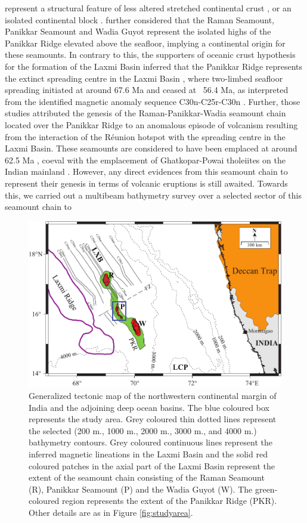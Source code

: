 \documentclass[twocolumn]{article}
\begin{document}
\begin{figure}[!htb]
\end{figure} represent a structural feature of less altered stretched continental crust \citep{Krishna2006}, or an isolated continental block \citep{Geoffroy2020}. \cite{Krishna2006} further considered that the Raman Seamount, Panikkar Seamount and Wadia Guyot represent the isolated highs of the Panikkar Ridge elevated above the seafloor, implying a continental origin for these seamounts. In contrary to this, the supporters of oceanic crust hypothesis for the formation of the Laxmi Basin inferred that the Panikkar Ridge represents the extinct spreading centre in the Laxmi Basin \citep{Bhattacharya1994a,Bhattacharya1994b}, where two-limbed seafloor spreading initiated at around 67.6 Ma and ceased at ~56.4 Ma, as interpreted from the identified magnetic anomaly sequence C30n-C25r-C30n \citep{Bhattacharya2015,Yatheesh2020}. Further, those studies attributed the genesis of the Raman-Panikkar-Wadia seamount chain located over the Panikkar Ridge to an anomalous episode of volcanism resulting from the interaction of the R\'eunion hotspot with the spreading centre in the Laxmi Basin. These seamounts are considered to have been emplaced at around 62.5 Ma \citep{Bhattacharya2015,Yatheesh2020}, coeval with the emplacement of Ghatkopar-Powai tholeiites on the Indian mainland \citep{Pande2017}. However, any direct evidences from this seamount chain to represent their genesis in terms of volcanic eruptions is still awaited. Towards this, we carried out a multibeam bathymetry survey over a selected sector of this seamount chain to
\begin{figure}[!htb]
	\centering
	\includegraphics[width=0.8\linewidth]{tectonic-framework.pdf}
	\caption{
		Generalized tectonic map of the northwestern continental margin of India and the adjoining deep ocean basins. The blue coloured box represents the study area. Grey coloured thin dotted lines represent the selected (200 m., 1000 m., 2000 m., 3000 m., and 4000 m.) bathymetry contours. Grey coloured continuous lines represent the inferred magnetic lineations in the Laxmi Basin  \citep{Bhattacharya2015} and the solid red coloured patches in the axial part of the Laxmi Basin represent the extent of the seamount chain \citep{Bhattacharya1994b} consisting of the Raman Seamount (R), Panikkar Seamount (P) and the Wadia Guyot (W). The green-coloured region represents the extent of the Panikkar Ridge (PKR).  Other details are as in Figure \ref{fig:studyarea}.
	}
	\label{fig:studyarea2}
\end{figure}
\end{document}
